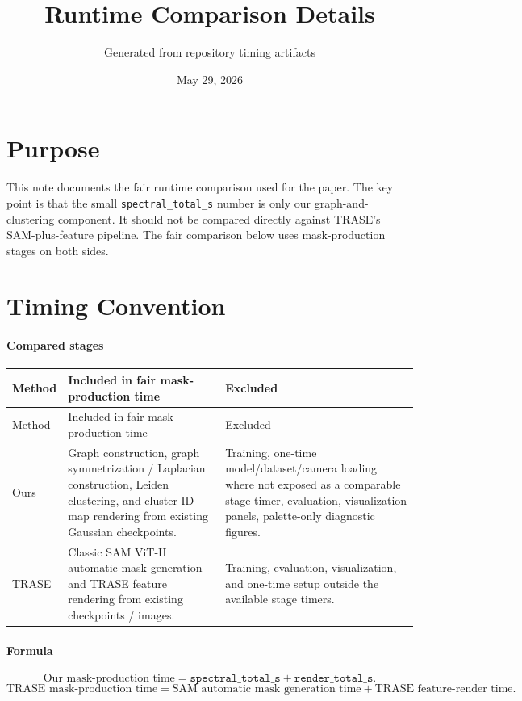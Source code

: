 \documentclass[10pt]{article}
\begin{document}
\title{Runtime Comparison Details}
\author{Generated from repository timing artifacts}
\date{May 29, 2026}
\maketitle

\section{Purpose}
This note documents the fair runtime comparison used for the paper.  The key point is that the small \texttt{spectral\_total\_s} number is only our graph-and-clustering component.  It should not be compared directly against TRASE's SAM-plus-feature pipeline.  The fair comparison below uses mask-production stages on both sides.

\section{Timing Convention}
\paragraph{Compared stages}
\small
\begin{longtable}{lp{6.2cm}p{6.2cm}}
\toprule
Method & Included in fair mask-production time & Excluded \\
\midrule
\endfirsthead
\toprule
Method & Included in fair mask-production time & Excluded \\
\midrule
\endhead
Ours & Graph construction, graph symmetrization / Laplacian construction, Leiden clustering, and cluster-ID map rendering from existing Gaussian checkpoints. & Training, one-time model/dataset/camera loading where not exposed as a comparable stage timer, evaluation, visualization panels, palette-only diagnostic figures. \\
TRASE & Classic SAM ViT-H automatic mask generation and TRASE feature rendering from existing checkpoints / images. & Training, evaluation, visualization, and one-time setup outside the available stage timers. \\
\bottomrule
\end{longtable}
\normalsize

\paragraph{Formula}
\[
\text{Our mask-production time}
= \texttt{spectral\_total\_s} + \texttt{render\_total\_s}.
\]
\[
\text{TRASE mask-production time}
= \text{SAM automatic mask generation time} + \text{TRASE feature-render time}.
\]
\end{document}
